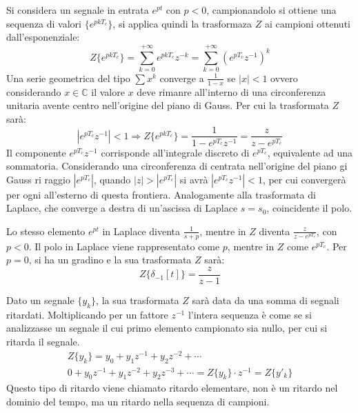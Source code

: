 \documentclass{article}
\numberwithin{equation}{subsection}
\begin{document}
Si considera un segnale in entrata $e^{pt}$ con $p<0$, campionandolo si ottiene una sequenza di valori $\{e^{pkT_c}\}$, si applica quindi la trasformaza $Z$ ai campioni 
ottenuti dall'esponenziale:
\begin{equation}
    Z\{e^{pkT_c}\}=\sum_{k=0}^{+\infty}e^{pkT_c}z^{-k}=\sum_{k=0}^{+\infty}\left(e^{pT_c}z^{-1}\right)^k
\end{equation}
Una serie geometrica del tipo $\sum x^k$ converge a $\displaystyle\frac{1}{1-x}$ se $|x|<1$ ovvero considerando $x\in\mathbb{C}$ il valore $x$ deve rimanre all'interno 
di una circonferenza unitaria avente centro nell'origine del piano di Gauss. Per cui la trasformata $Z$ sarà: 
\begin{equation}
    |e^{pT_c}z^{-1}|<1\Rightarrow Z\{e^{pkT_c}\}=\displaystyle\frac{1}{1-e^{pT_c}z^{-1}}=\frac{z}{z-e^{pT_c}}
\end{equation}
Il componente $e^{pT_c}z^{-1}$ corrisponde all'integrale discreto di $e^{pT_c}$, equivalente ad una sommatoria. Considerando una circonferenza di centrata nell'origine 
del piano gi Gauss ri raggio $|e^{pT_c}|$, quando $|z|>|e^{pT_c}|$ si avrà $|e^{pT_c}z^{-1}|<1$, per cui convergerà per ogni all'esterno di questa frontiera. 
Analogamente alla trasformata di Laplace, che converge a destra di un'ascissa di Laplace $s=s_0$, coincidente il polo. 

Lo stesso elemento $e^{pt}$ in Laplace diventa $\displaystyle\frac{1}{s+p}$, mentre in $Z$ diventa $\displaystyle\frac{z}{z-e^{pT_c}}$, con $p<0$. Il polo in Laplace 
viene rappresentato come $p$, mentre in $Z$ come $e^{pT_c}$. Per $p=0$, si ha un gradino e la sua trasformata $Z$ sarà:
\begin{equation}
    Z\{\delta_{-1}[t]\}=\displaystyle\frac{z}{z-1}
\end{equation}


Dato un segnale $\{y_k\}$, la sua trasformata $Z$ sarà data da una somma di segnali ritardati. Moltiplicando per un fattore $z^{-1}$ l'intera sequenza è come se si analizzasse 
un segnale il cui primo elemento campionato sia nullo, per cui si ritarda il segnale. 
\begin{gather}
    Z\{y_k\}=y_0+y_1z^{-1}+y_2z^{-2}+\cdots\\
    0+y_0z^{-1}+y_1z^{-2}+y_2z^{-3}+\cdots=Z\{y_k\}\cdot z^{-1}=Z\{y'_k\}
\end{gather}
Questo tipo di ritardo viene chiamato ritardo elementare, non è un ritardo nel dominio del tempo, ma un ritardo nella sequenza di campioni. 
\end{document}
